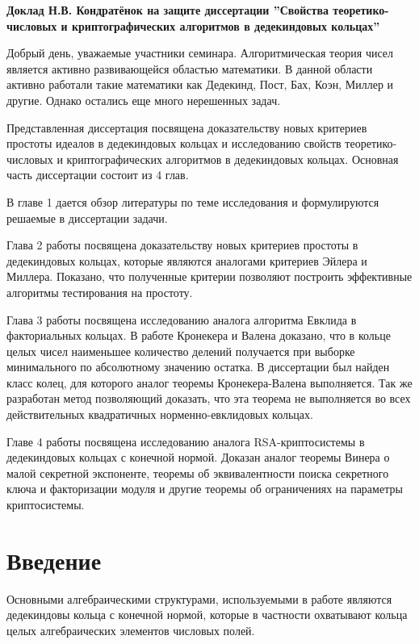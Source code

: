 \documentclass[a4paper,12pt]{article} %
\begin{document}
\begin{center}
    \textbf{Доклад Н.В. Кондратёнок на защите диссертации ''Свойства теоретико-числовых и криптографических алгоритмов в дедекиндовых кольцах''}
\end{center}

Добрый день, уважаемые участники семинара.
Алгоритмическая теория чисел является активно развивающейся областью математики.
В данной области активно работали такие математики как Дедекинд, Пост, Бах, Коэн, Миллер и другие.
Однако остались еще много нерешенных задач.

Представленная диссертация посвящена доказательству новых критериев простоты идеалов в дедекиндовых кольцах и исследованию свойств теоретико-числовых и криптографических алгоритмов в дедекиндовых кольцах.
Основная часть диссертации состоит из 4 глав.

В главе 1 дается обзор литературы по теме исследования и формулируются решаемые в диссертации задачи.

Глава 2 работы посвящена доказательству новых критериев простоты в дедекиндовых кольцах, которые являются аналогами критериев Эйлера и Миллера.
Показано, что полученные критерии позволяют построить эффективные алгоритмы тестирования на простоту.

Глава 3 работы посвящена исследованию аналога алгоритма Евклида в факториальных кольцах.
В работе Кронекера и Валена доказано, что в кольце целых чисел наименьшее количество делений получается при выборке минимального по абсолютному значению остатка.
В диссертации был найден класс колец, для которого аналог теоремы Кронекера-Валена выполняется.
Так же разработан метод позволяющий доказать, что эта теорема не выполняется во всех действительных квадратичных норменно-евклидовых кольцах.
    
Главе 4 работы посвящена исследованию аналога RSA-криптосистемы в дедекиндовых кольцах с конечной нормой.
Доказан аналог теоремы Винера о малой секретной экспоненте, теоремы об эквивалентности поиска секретного ключа и факторизации модуля и другие теоремы об ограничениях на параметры криптосистемы.

\section{Введение}

Основными алгебраическими структурами, используемыми в работе являются дедекиндовы кольца с конечной нормой, которые в частности охватывают кольца целых алгебраических элементов числовых полей.
\end{document}
